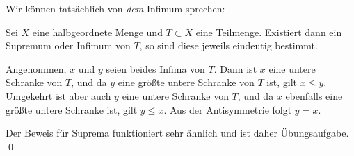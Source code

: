 Wir können tatsächlich von \textit{dem} Infimum sprechen:

\begin{sat}
	Sei $X$ eine halbgeordnete Menge und $T\subset X$ eine Teilmenge. Existiert dann ein Supremum oder Infimum von $T$, so sind diese jeweils eindeutig bestimmt.
\end{sat}

\begin{bew}
	Angenommen, $x$ und $y$ seien beides Infima von $T$. Dann ist $x$ eine untere Schranke von $T$, und da $y$ eine größte untere Schranke von $T$ ist, gilt $x\leq y$. Umgekehrt ist aber auch $y$ eine untere Schranke von $T$, und da $x$ ebenfalls eine größte untere Schranke ist, gilt $y\leq x$. Aus der Antisymmetrie folgt $y=x$.
	
	Der Beweis für Suprema funktioniert sehr ähnlich und ist daher Übungsaufgabe. \qed
\end{bew}

